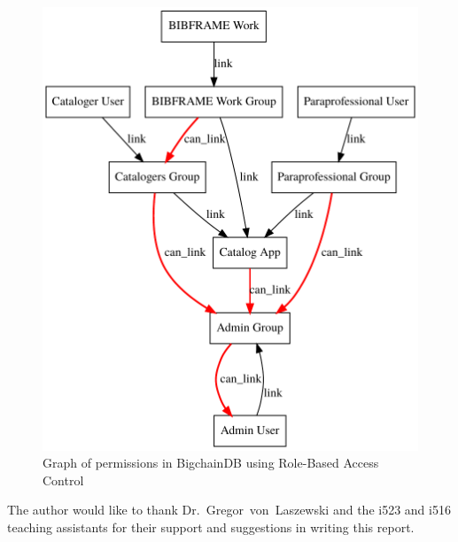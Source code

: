 \begin{figure}[!htb]
	\centering\includegraphics[width=\columnwidth]{images/rbac-graph.pdf}  
	\caption{Graph of permissions in BigchainDB using Role-Based Access 
	Control}\label{f:rbac2}
\end{figure}




\begin{acks}
The author would like to thank Dr.~Gregor~von~Laszewski and the i523
and i516 teaching assistants for their support and suggestions in writing
this report.
\end{acks}


 

